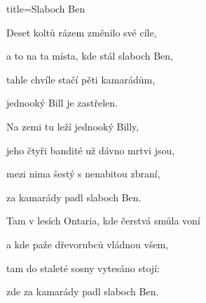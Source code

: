 \begin{song}{title=\predtitle\centering Slaboch Ben \\\large  \vspace*{-0.3cm}}
\begin{centerjustified}
	
\sloka	
	Deset koltů rázem změnilo své cíle,
	
	a to na ta místa, kde stál slaboch Ben,
	
	tahle chvíle stačí pěti kamarádům,
	
	jednooký Bill je zastřelen.

	
\sloka	
	Na zemi tu leží jednooký Billy,
	
	jeho čtyři bandité už dávno mrtvi jsou,
	
	mezi nima šestý s nenabitou zbraní,
	
	za kamarády padl slaboch Ben.

	
\sloka	
	Tam v lesích Ontaria, kde čerstvá smůla voní

	a kde paže dřevorubců vládnou všem,
	
	tam do staleté sosny vytesáno stojí:
	
	zde za kamarády padl slaboch Ben.



\end{centerjustified}
\setcounter{Slokočet}{0}
\end{song}
